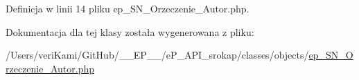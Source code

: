 Definicja w linii 14 pliku ep\-\_\-\-S\-N\-\_\-\-Orzeczenie\-\_\-\-Autor.\-php.



Dokumentacja dla tej klasy została wygenerowana z pliku\-:\begin{DoxyCompactItemize}
\item 
/\-Users/veri\-Kami/\-Git\-Hub/\-\_\-\-\_\-\-E\-P\-\_\-\-\_\-/e\-P\-\_\-\-A\-P\-I\-\_\-srokap/classes/objects/\hyperlink{ep___s_n___orzeczenie___autor_8php}{ep\-\_\-\-S\-N\-\_\-\-Orzeczenie\-\_\-\-Autor.\-php}\end{DoxyCompactItemize}
